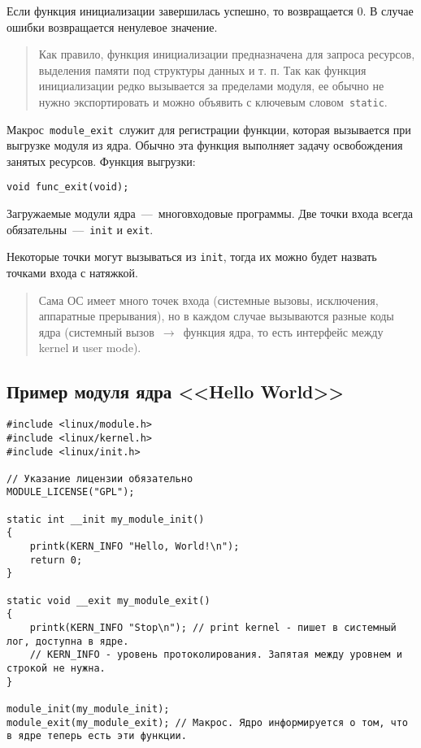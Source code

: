 Если функция инициализации завершилась успешно, то возвращается 0. В случае ошибки возвращается ненулевое значение.

\begin{quote}
	Как правило, функция инициализации предназначена для запроса ресурсов, выделения памяти под структуры данных и т. п. Так как функция инициализации редко вызывается за пределами модуля, ее обычно не нужно экспортировать и можно объявить с ключевым словом \texttt{static}.
\end{quote}

Макрос \texttt{module\_exit} служит для регистрации функции, которая вызывается при выгрузке модуля из ядра. Обычно эта функция выполняет задачу освобождения занятых ресурсов. Функция выгрузки:

\begin{lstlisting}
void func_exit(void);
\end{lstlisting}

Загружаемые модули ядра~---~многовходовые программы. Две точки входа всегда обязательны~---~\texttt{init} и \texttt{exit}.

Некоторые точки могут вызываться из \texttt{init}, тогда их можно будет назвать точками входа с натяжкой.

\begin{quote}
	Сама ОС имеет много точек входа (системные вызовы, исключения, аппаратные прерывания), но в каждом случае вызываются разные коды ядра (системный вызов~$\rightarrow$~функция ядра, то есть интерфейс между kernel и user mode).
\end{quote}

\subsection{Пример модуля ядра <<Hello World>>}

\begin{lstlisting}
#include <linux/module.h>
#include <linux/kernel.h>
#include <linux/init.h>

// Указание лицензии обязательно
MODULE_LICENSE("GPL");

static int __init my_module_init()
{
    printk(KERN_INFO "Hello, World!\n");
    return 0;
}

static void __exit my_module_exit()
{
    printk(KERN_INFO "Stop\n"); // print kernel - пишет в системный лог, доступна в ядре.
    // KERN_INFO - уровень протоколирования. Запятая между уровнем и строкой не нужна.
}

module_init(my_module_init);
module_exit(my_module_exit); // Макрос. Ядро информируется о том, что в ядре теперь есть эти функции.
\end{lstlisting}

